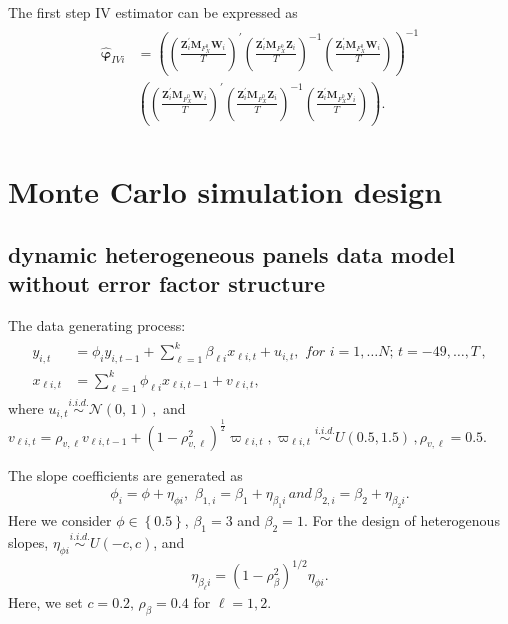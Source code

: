 \documentclass[12pt,a4paper,hyperref]{article}
\begin{document}
The first step IV estimator can be expressed as
\begin{align}
\begin{split}
\boldsymbol{\hat{\varphi}}_{IVi}&=\left(\left(\frac{\boldsymbol{Z}^{'}_{i}\boldsymbol{M}_{F^{0}_{X}}\boldsymbol{W}_{i}}{T } \right)^{'} \left(\frac{\boldsymbol{Z}^{'}_{i}\boldsymbol{M}_{F^{0}_{X}}\boldsymbol{Z}_{i}}{T}  \right)^{-1}  \left(\frac{\boldsymbol{Z}^{'}_{i}\boldsymbol{M}_{F^{0}_{X}}\boldsymbol{W}_{i}}{T}  \right)\right)^{-1} \\
&\left(\left( \frac{\boldsymbol{Z}^{'}_{i}\boldsymbol{M}_{F^{0}_{X}}\boldsymbol{W}_{i}}{T}  \right)^{'} \left(\frac{\boldsymbol{Z}^{'}_{i}\boldsymbol{M}_{F^{0}_{X}}\boldsymbol{Z}_{i}}{T}  \right)^{-1}  \left(\frac{\boldsymbol{Z}^{'}_{i}\boldsymbol{M}_{F^{0}_{X}}\boldsymbol{y}_{i}}{T}  \right)\right).
\end{split}
\end{align}







\section{Monte Carlo simulation design}
\subsection{dynamic heterogeneous panels data model without error factor structure}
The data generating process:
\begin{align}
\begin{split}
y_{i,t}&= \phi_{i} y_{i,t-1}+ \sum^{k}_{\ell=1}\beta_{\ell i}x_{\ell i,t}+u_{i,t}, \,\, for\,\,i=1,\ldots N;\,t=-49,\ldots,T\, , \\ \label{M1}
x_{\ell i,t}&=\sum^{k}_{\ell=1}\phi_{\ell i}x_{\ell i,t-1}+v_{\ell i,t},
\end{split}
\end{align}
where $u_{i,t}\overset{i.i.d.}{\sim} \mathcal{N}(0,\,1)\,,$ and $v_{\ell i,t}=\rho_{v, \ell}v_{\ell i,t-1}+\left( 1-\rho^{2}_{v, \ell} \right)^{\frac{1}{2}}\varpi_{\ell i,t}, \varpi_{\ell i,t} \overset{i.i.d.}{\sim} U(0.5, 1.5) \, ,\rho_{v, \ell}=0.5.$

The slope coefficients are generated as
\begin{align}
\phi_{i}=\phi+\eta_{\phi i},\,\, \beta_{1,i}=\beta_{1}+\eta_{\beta_{1} i}\, and\, \beta_{2,i}=\beta_{2}+\eta_{\beta_{2}i}.
\end{align}
Here we consider $\phi \in \left\{0.5 \right\}$, $\beta_{1}=3$ and $\beta_{2}=1$. For the design of heterogenous slopes, $\eta_{\phi i} \overset{i.i.d.}{\sim} U\left( -c, c\right)$, and
\begin{align}
\eta_{\beta_{\ell}i}= \left(1-\rho^{2}_{\beta}  \right)^{1/2}\eta_{\phi i}.
\end{align}
Here, we set $c=0.2,\, \rho_{\beta}=0.4$ for $\ell=1,2.$
\end{document}
